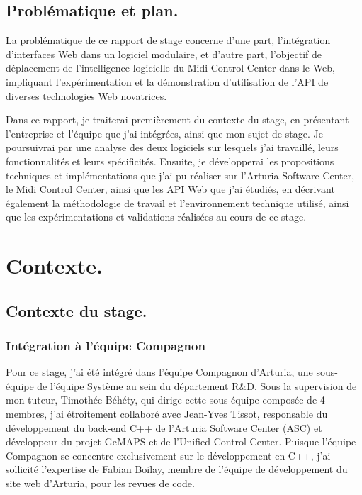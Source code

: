 \documentclass[francais]{rapportPFE}  %
\begin{document}
\subsection{Problématique et plan.}

La problématique de ce rapport de stage concerne d'une part, l'intégration d'interfaces Web dans un logiciel modulaire, et d'autre part, l'objectif de déplacement de l'intelligence logicielle du Midi Control Center dans le Web, impliquant l'expérimentation et la démonstration d'utilisation de l'API de diverses technologies Web novatrices.

Dans ce rapport, je traiterai premièrement du contexte du stage, en présentant l'entreprise et l'équipe que j'ai intégrées, ainsi que mon sujet de stage. Je poursuivrai par une analyse des deux logiciels sur lesquels j'ai travaillé, leurs fonctionnalités et leurs spécificités. Ensuite, je développerai les propositions techniques et implémentations que j'ai pu réaliser sur l'Arturia Software Center, le Midi Control Center, ainsi que les API Web que j'ai étudiés, en décrivant également la méthodologie de travail et l'environnement technique utilisé, ainsi que les expérimentations et validations réalisées au cours de ce stage.


\section{Contexte.}

\subsection{Contexte du stage.}
\subsubsection{Intégration à l'équipe Compagnon}
Pour ce stage, j'ai été intégré dans l'équipe Compagnon d'Arturia, une sous-équipe de l'équipe Système au sein du département R\&D. Sous la supervision de mon tuteur, Timothée Béhéty, qui dirige cette sous-équipe composée de 4 membres, j'ai étroitement collaboré avec Jean-Yves Tissot, responsable du développement du back-end C++ de l'Arturia Software Center (ASC) et développeur du projet GeMAPS et de l'Unified Control Center. Puisque l'équipe Compagnon se concentre exclusivement sur le développement en C++, j'ai sollicité l'expertise de Fabian Boilay, membre de l'équipe de développement du site web d'Arturia, pour les revues de code. 
\end{document}

